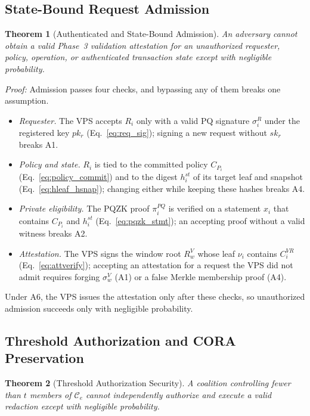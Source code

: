 \documentclass[lettersize,journal]{IEEEtran}
\newtheorem{theorem}{Theorem}
\begin{document}
\subsection{State-Bound Request Admission}

\begin{theorem}[Authenticated and State-Bound Admission]
An adversary cannot obtain a valid Phase~3 validation attestation for
an unauthorized requester, policy, operation, or authenticated
transaction state except with negligible probability.
\end{theorem}

\emph{Proof:} Admission passes four checks, and bypassing any of them
breaks one assumption.
\begin{itemize}[leftmargin=*,nosep]
\item \emph{Requester.} The VPS accepts $R_i$ only with a valid PQ
signature $\sigma_i^R$ under the registered key $pk_r$
(Eq.~\eqref{eq:req_sig}); signing a new request without $sk_r$ breaks
A1.
\item \emph{Policy and state.} $R_i$ is tied to the committed policy
$C_{P_i}$ (Eq.~\eqref{eq:policy_commit}) and to the digest $h_i^{st}$ of
its target leaf and snapshot (Eq.~\eqref{eq:hleaf_hsnap}); changing
either while keeping these hashes breaks A4.
\item \emph{Private eligibility.} The PQZK proof $\pi_i^{PQ}$ is verified
on a statement $x_i$ that contains $C_{P_i}$ and $h_i^{st}$
(Eq.~\eqref{eq:pqzk_stmt}); an accepting proof without a valid witness
breaks A2.
\item \emph{Attestation.} The VPS signs the window root $R_w^V$ whose
leaf $\nu_i$ contains $C_i^{VR}$ (Eq.~\eqref{eq:attverify}); accepting an
attestation for a request the VPS did not admit requires forging
$\sigma_w^V$ (A1) or a false Merkle membership proof (A4).
\end{itemize}
Under A6, the VPS issues the attestation only after these checks, so
unauthorized admission succeeds only with negligible probability.

\subsection{Threshold Authorization and CORA Preservation}

\begin{theorem}[Threshold Authorization Security]
A coalition controlling fewer than $t$ members of
$\mathcal{C}_e$ cannot independently authorize and execute a valid
redaction except with negligible probability.
\end{theorem}
\end{document}
